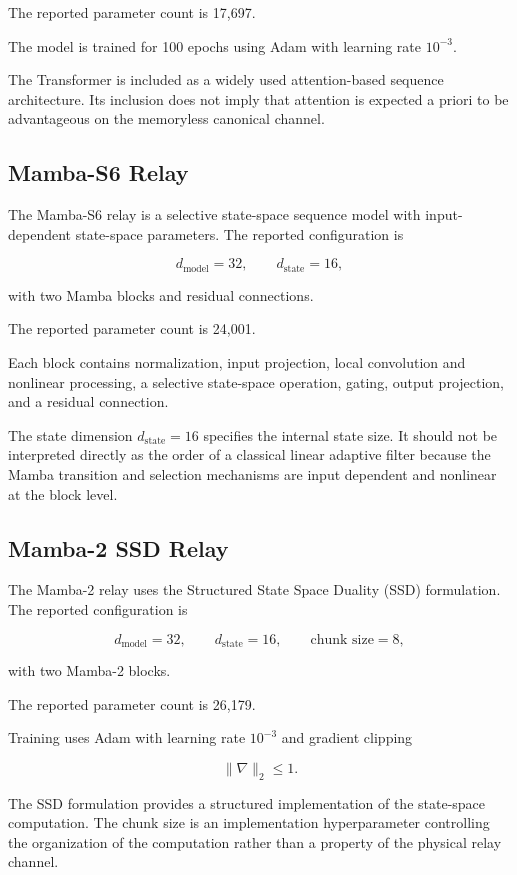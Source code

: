 The reported parameter count is 17,697.

The model is trained for 100 epochs using Adam with learning rate
$10^{-3}$.

The Transformer is included as a widely used attention-based sequence
architecture. Its inclusion does not imply that attention is expected
a priori to be advantageous on the memoryless canonical channel.


\subsection{Mamba-S6 Relay}

The Mamba-S6 relay is a selective state-space sequence model with
input-dependent state-space parameters. The reported configuration is

\[
d_{\mathrm{model}}=32,
\qquad
d_{\mathrm{state}}=16,
\]

with two Mamba blocks and residual connections.

The reported parameter count is 24,001.

Each block contains normalization, input projection, local convolution
and nonlinear processing, a selective state-space operation, gating,
output projection, and a residual connection.

The state dimension $d_{\mathrm{state}}=16$ specifies the internal
state size. It should not be interpreted directly as the order of a
classical linear adaptive filter because the Mamba transition and
selection mechanisms are input dependent and nonlinear at the block
level.


\subsection{Mamba-2 SSD Relay}

The Mamba-2 relay uses the Structured State Space Duality (SSD)
formulation. The reported configuration is

\[
d_{\mathrm{model}}=32,
\qquad
d_{\mathrm{state}}=16,
\qquad
\text{chunk size}=8,
\]

with two Mamba-2 blocks.

The reported parameter count is 26,179.

Training uses Adam with learning rate $10^{-3}$ and gradient clipping

\[
\|\nabla\|_2\leq1.
\]

The SSD formulation provides a structured implementation of the
state-space computation. The chunk size is an implementation
hyperparameter controlling the organization of the computation rather
than a property of the physical relay channel.


